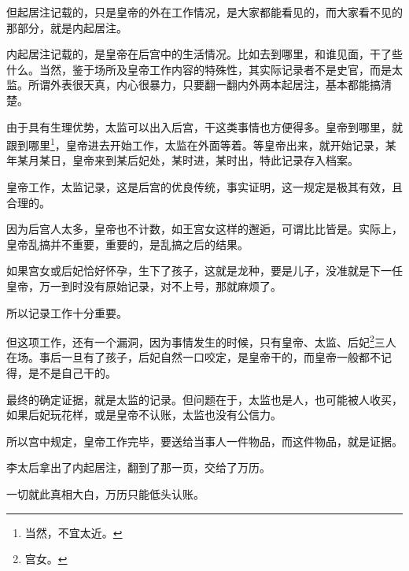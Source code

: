 \begin{multicols}{\theparacolNo}
		但起居注记载的，只是皇帝的外在工作情况，是大家都能看见的，而大家看不见的那部分，就是内起居注。

		内起居注记载的，是皇帝在后宫中的生活情况。比如去到哪里，和谁见面，干了些什么。当然，鉴于场所及皇帝工作内容的特殊性，其实际记录者不是史官，而是太监。所谓外表很天真，内心很暴力，只要翻一翻内外两本起居注，基本都能搞清楚。

		由于具有生理优势，太监可以出入后宫，干这类事情也方便得多。皇帝到哪里，就跟到哪里\footnote{当然，不宜太近。}，皇帝进去开始工作，太监在外面等着。等皇帝出来，就开始记录，某年某月某日，皇帝来到某后妃处，某时进，某时出，特此记录存入档案。

		皇帝工作，太监记录，这是后宫的优良传统，事实证明，这一规定是极其有效，且合理的。

		因为后宫人太多，皇帝也不计数，如王宫女这样的邂逅，可谓比比皆是。实际上，皇帝乱搞并不重要，重要的，是乱搞之后的结果。

		如果宫女或后妃恰好怀孕，生下了孩子，这就是龙种，要是儿子，没准就是下一任皇帝，万一到时没有原始记录，对不上号，那就麻烦了。

		所以记录工作十分重要。

		但这项工作，还有一个漏洞，因为事情发生的时候，只有皇帝、太监、后妃\footnote{宫女。}三人在场。事后一旦有了孩子，后妃自然一口咬定，是皇帝干的，而皇帝一般都不记得，是不是自己干的。

		最终的确定证据，就是太监的记录。但问题在于，太监也是人，也可能被人收买，如果后妃玩花样，或是皇帝不认账，太监也没有公信力。

		所以宫中规定，皇帝工作完毕，要送给当事人一件物品，而这件物品，就是证据。

		李太后拿出了内起居注，翻到了那一页，交给了万历。

		一切就此真相大白，万历只能低头认账。

		\ifnum{}
	\end{multicols}
\fi
\newpage
